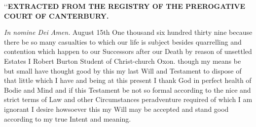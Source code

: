 {\scriptsize{}\lq\lq\textbf{EXTRACTED FROM THE REGISTRY OF THE PREROGATIVE COURT OF CANTERBURY.}

\emph{In nomine Dei Amen.} August 15th One thousand six hundred thirty nine because there be so many casualties to which our life is subject besides quarrelling and contention which happen to our Successors after our Death by reason of unsettled Estates I Robert Burton Student of Christ-church Oxon. though my means be but small have thought good by this my last Will and Testament to dispose of that little which I have and being at this present I thank God in perfect health of Bodie and Mind and if this Testament be not so formal according to the nice and strict terms of Law and other Circumstances peradventure required of which I am ignorant I desire howsoever this my Will may be accepted and stand good according to my true Intent and meaning.

}
